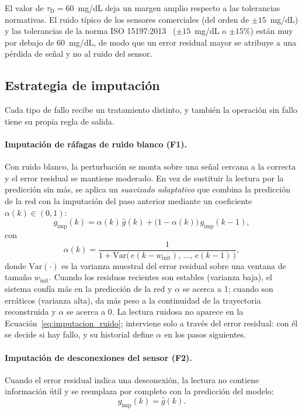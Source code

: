 \documentclass{report}
\begin{document}
El valor de $\tau_{\mathrm{D}} = 60$~mg/dL deja un margen amplio respecto a las tolerancias normativas. El ruido típico de los sensores comerciales (del orden de $\pm 15$~mg/dL) y las tolerancias de la norma ISO 15197:2013~\cite{iso15197_2013} ($\pm 15$~mg/dL o $\pm 15\%$) están muy por debajo de 60~mg/dL, de modo que un error residual mayor se atribuye a una pérdida de señal y no al ruido del sensor.

\subsection*{Estrategia de imputación}
\label{subsec:estrategia_imputacion}

Cada tipo de fallo recibe un tratamiento distinto, y también la operación sin fallo tiene su propia regla de salida.

\paragraph{Imputación de ráfagas de ruido blanco (F1).} Con ruido blanco, la perturbación se monta sobre una señal cercana a la correcta y el error residual se mantiene moderado. En vez de sustituir la lectura por la predicción sin más, se aplica un \textit{suavizado adaptativo} que combina la predicción de la red con la imputación del paso anterior mediante un coeficiente $\alpha(k) \in (0, 1)$:
\begin{equation}
\label{eq:imputacion_ruido}
g_{\mathrm{imp}}(k) = \alpha(k)\, \hat{g}(k) + \big(1 - \alpha(k)\big)\, g_{\mathrm{imp}}(k\!-\!1),
\end{equation}
con
\begin{equation}
\label{eq:alpha_adaptativo}
\alpha(k) = \frac{1}{1 + \mathrm{Var}\big(\, e(k\!-\!w_{\mathrm{init}}),\,\ldots,\,e(k\!-\!1) \,\big)},
\end{equation}
donde $\mathrm{Var}(\cdot)$ es la varianza muestral del error residual sobre una ventana de tamaño $w_{\mathrm{init}}$. Cuando los residuos recientes son estables (varianza baja), el sistema confía más en la predicción de la red y $\alpha$ se acerca a 1; cuando son erráticos (varianza alta), da más peso a la continuidad de la trayectoria reconstruida y $\alpha$ se acerca a 0. La lectura ruidosa no aparece en la Ecuación~\eqref{eq:imputacion_ruido}; interviene solo a través del error residual: con él se decide si hay fallo, y su historial define $\alpha$ en los pasos siguientes.

\paragraph{Imputación de desconexiones del sensor (F2).} Cuando el error residual indica una desconexión, la lectura no contiene información útil y se reemplaza por completo con la predicción del modelo:
\begin{equation}
\label{eq:imputacion_desconexion}
g_{\mathrm{imp}}(k) = \hat{g}(k).
\end{equation}
\end{document}
